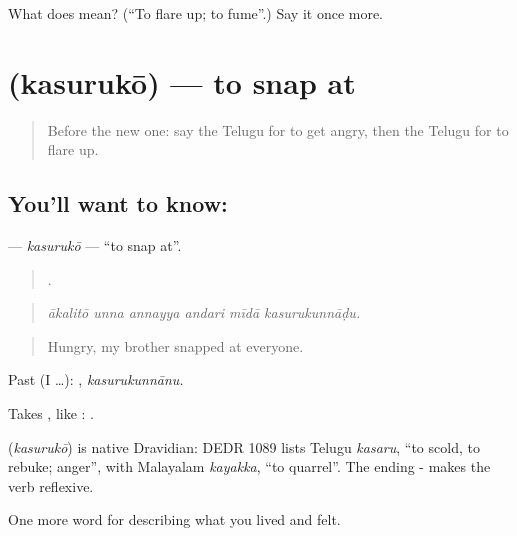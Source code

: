 \begin{tcolorbox}[breakable,colback=teal!4,colframe=teal!35!black,title={Before you move on}]
What does  mean? (\textquotedblleft{}To flare up; to fume\textquotedblright{}.) Say it once more.
\end{tcolorbox}
\section[\texorpdfstring{\te{కసురుకో} (kasurukō)}{కసురుకో (kasurukō)}]{ (kasurukō) — to snap at}

\label{lesson:TE-C497-kasuruko}



\begin{quote}
Before the new one: say the Telugu for to get angry, then the Telugu for to flare up.
\end{quote}

\subsection*{You'll want to know: }
\textbf{} — \emph{kasurukō} — \textquotedblleft{}to snap at\textquotedblright{}.

\begin{quote}
     .
\end{quote}

\begin{quote}
\emph{ākalitō unna annayya andari mīdā kasurukunnāḍu.}
\end{quote}

\begin{quote}
Hungry, my brother snapped at everyone.
\end{quote}

Past (I …): , \emph{kasurukunnānu}.

Takes , like :   .

\begin{cousinweb}
\textbf{} (\emph{kasurukō}) is native Dravidian: DEDR 1089 lists Telugu \emph{kasaru}, \textquotedblleft{}to scold, to rebuke; anger\textquotedblright{}, with Malayalam \emph{kayakka}, \textquotedblleft{}to quarrel\textquotedblright{}. The ending - makes the verb reflexive.
\end{cousinweb}

\begin{grammarlens}[title={What you've built}]
One more word for describing what you lived and felt.
\end{grammarlens}

